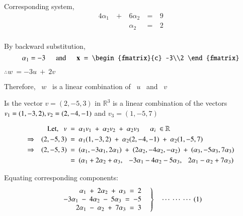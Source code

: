 \documentclass[12pt]{article}
\begin{document}
Corresponding system,
\vspace{-\baselineskip}
\begin{alignat*}{4}
   \alpha_1 &\ +\ & 6 \alpha_2 &\ =\ & 9 \\
   && \alpha_2 &\ =\ & 2 \\
\end{alignat*}

\vspace{-\baselineskip}
By backward substitution,
$$\alpha_1 = -3 \tabs \text{and} \tabs \mathbf{x} \ = \ \begin{fmatrix}{c}
   -3\\2
\end{fmatrix}$$
\vspace{-\baselineskip}
\begin{center}
$\therefore w \ = -3u \ + \ 2v$

Therefore, \ $w$ \ is a linear combination of \ $u$ \ and \ $v$
\end{center}


\vspace{5ex}
 Is the vector $v=(2,-5,3)$ in $\mathbb{R}^3$ is a linear combination of the vectors $v_1=(1,-3,2), \\ v_2=(2,-4,-1)$ and $v_3=(1,-5,7)$

\vspace{3ex}
\vspace{-\baselineskip}
\begin{align*}
   \text{Let, \ \ } v \ &=\ \alpha_1 v_1 \ +\ \alpha_2 v_2 \ +\ \alpha_2 v_3 \tabs \alpha_i \ \in \mathbb{R}\\
   \Rightarrow \tab (2,-5,3) \ &=\ \alpha_1 (1,-3,2) \ +\ \alpha_2 (2,-4,-1) \ +\ \alpha_2 (1,-5,7)\\
   \Rightarrow \tab (2,-5,3) \ &=\ (\alpha_1,-3 \alpha_1, 2 \alpha_1) \ +\ (2 \alpha_2,-4 \alpha_2,-\alpha_2) \ +\ (\alpha_3,-5 \alpha_3, 7 \alpha_3) \\
   \ &=\ (\alpha_1+2 \alpha_2+\alpha_3, \tab -3 \alpha_1-4 \alpha_2-5 \alpha_3, \tab 2 \alpha_1-\alpha_2+7 \alpha_3) 
\end{align*}

Equating corresponding components:
\vspace{-0.75\baselineskip}
\begin{equation*}
   \left.
   \begin{array}{r}
      \alpha_1 \ + \ 2 \alpha_2 \ + \ \alpha_3 \ = \ 2 \\
      -3 \alpha_1 \ - \ 4 \alpha_2 \ - \ 5 \alpha_3 \ = \ -5 \\
      2 \alpha_1 \ - \ \alpha_2 \ + \ 7 \alpha_3 \ = \ 3
   \end{array}
   \ \ \  \right\} \ \ \  \ \cdots \ \cdots \ \cdots \ (1)
\end{equation*}
\end{document}

